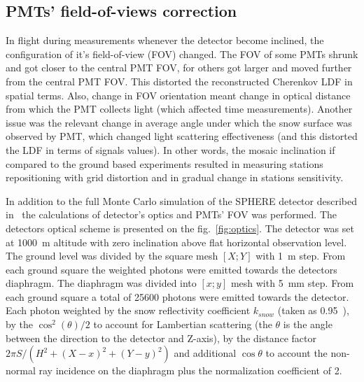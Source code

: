 \documentclass[final,5p,times,twocolumn]{elsarticle}
\begin{document}
\subsection{PMTs' field-of-views correction}

In flight during measurements whenever the detector become inclined, the configuration of it's field-of-view (FOV) changed. The FOV of some PMTs shrunk and got closer to the central PMT FOV, for others got larger and moved further from the central PMT FOV. This distorted the reconstructed Cherenkov LDF in spatial terms. Also, change in FOV orientation meant change in optical distance from which the PMT collects light (which affected time measurements). Another issue was the relevant change in average angle under which the snow surface was observed by PMT, which changed light scattering effectiveness (and this distorted the LDF in terms of signals values). In other words, the mosaic inclination if compared to the ground based experiments resulted in measuring stations repositioning with grid distortion and in gradual change in stations sensitivity.

In addition to the full Monte Carlo simulation of the SPHERE detector described in~\cite{Ant19} the calculations of detector's optics and PMTs' FOV was performed. The detectors optical scheme is presented on the fig.~\ref{fig:optics}. %
The detector was set at 1000~m altitude with zero inclination above flat horizontal observation level. The ground level was divided by the square mesh $[X;Y]$ with 1~m step. From each ground square the weighted photons were emitted towards the detectors diaphragm. The diaphragm was divided into $[x;y]$ mesh with 5~mm step. From each ground square a total of 25600 photons were emitted towards the detector. Each photon weighted by the snow reflectivity coefficient $k_{snow}$ (taken as 0.95~\cite{war82}), by the $\cos^2(\theta)/2$ to account for Lambertian scattering (the $\theta$ is the angle between the direction to the detector and Z-axis), by the distance factor $2\pi{}S/(H^2+(X-x)^2+(Y-y)^2)$ and additional $\cos\theta$ to account the non-normal ray incidence on the diaphragm {\color{red}plus} the normalization coefficient of 2.
\end{document}
